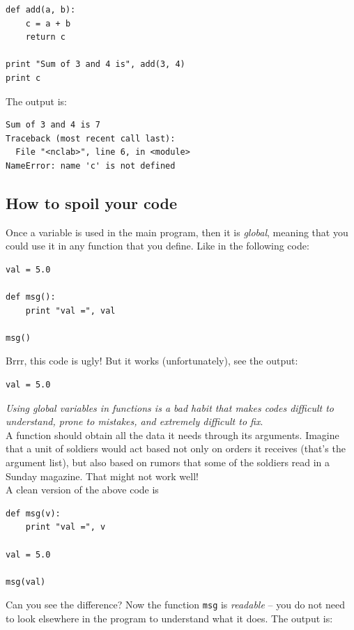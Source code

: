 \begin{verbatim}
def add(a, b):
    c = a + b
    return c

print "Sum of 3 and 4 is", add(3, 4)
print c
\end{verbatim}
The output is:

\begin{verbatim}
Sum of 3 and 4 is 7
Traceback (most recent call last):
  File "<nclab>", line 6, in <module>
NameError: name 'c' is not defined
\end{verbatim}

\subsection{How to spoil your code}

Once a variable is used in the main program, 
then it is {\em global}, meaning that you could use it in 
any function that you define. Like in the following 
code:

\begin{verbatim}
val = 5.0

def msg():
    print "val =", val

msg()
\end{verbatim}
Brrr, this code is ugly! But it works (unfortunately), see the output:

\begin{verbatim}
val = 5.0
\end{verbatim}
{\em Using global variables in functions is a bad habit that makes
codes difficult to understand, prone to mistakes, and extremely difficult to fix}.\\

\noindent
A function should 
obtain all the data it needs through its arguments. Imagine that a unit of soldiers 
would act based not only on orders it receives (that's the argument 
list), but also based on rumors that some of the soldiers read in a Sunday magazine. 
That might not work well!\\

\noindent
A clean version of the above code is

\begin{verbatim}
def msg(v):
    print "val =", v

val = 5.0

msg(val)
\end{verbatim}
Can you see the difference? Now the function {\tt msg} is {\em readable} -- you do not 
need to look elsewhere in the program to understand what it does. The output is:

